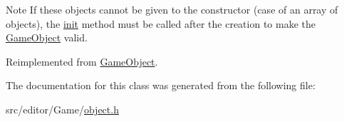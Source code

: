 \begin{DoxyNote}{\-Note}
\-If these objects cannot be given to the constructor (case of an array of objects), the \hyperlink{class_game_object_a97be7b59b2e76e7d60de2146b894eed9}{init} method must be called after the creation to make the \hyperlink{class_game_object}{\-Game\-Object} valid. 
\end{DoxyNote}


\-Reimplemented from \hyperlink{class_game_object_a41d4afe43f955e78ede0bbd4ad8957f8}{\-Game\-Object}.



\-The documentation for this class was generated from the following file\-:\begin{DoxyCompactItemize}
\item 
src/editor/\-Game/\hyperlink{object_8h}{object.\-h}\end{DoxyCompactItemize}
